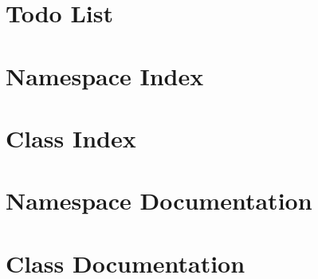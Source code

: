 \documentclass[twoside]{book}
\begin{document}
\chapter{Todo List}
\label{todo}
\hypertarget{todo}{}

\chapter{Namespace Index}

\chapter{Class Index}

\chapter{Namespace Documentation}

\chapter{Class Documentation}
























\newpage
{}
{}
\printindex
\end{document}
